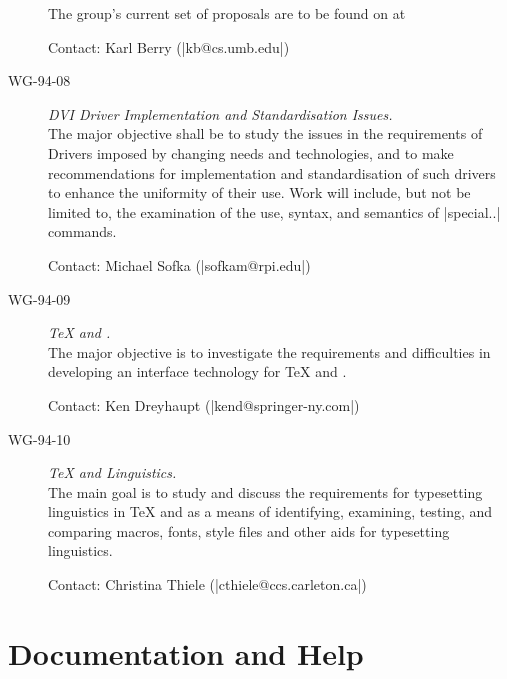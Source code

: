 \begin{description}
The group's current set of proposals are to be found on  at 

Contact: %
Karl Berry (\Email|kb@cs.umb.edu|)

\item[WG-94-08]\emph{DVI Driver Implementation and Standardisation Issues.}\\
The major objective shall be to study the issues in
the requirements of  Drivers imposed by changing needs and
technologies, and to make recommendations for implementation and
standardisation of such drivers to enhance the uniformity of their use.
Work will include, but not be limited to, the examination of the use,
syntax, and semantics of \cs|special{..}| commands.

Contact: Michael Sofka (\Email|sofkam@rpi.edu|)

\item[WG-94-09]\emph{\TeX{} and .}\\
The major objective is to investigate the
requirements and  difficulties in developing an interface technology
for \TeX{} and .

Contact: Ken Dreyhaupt (\Email|kend@springer-ny.com|)


\item[WG-94-10]\emph{\TeX{} and Linguistics.}\\
The main goal is to study and discuss the
requirements for typesetting linguistics in \TeX{} and as a means of
identifying, examining, testing, and comparing macros, fonts, style files
and other aids for typesetting linguistics.

Contact: Christina Thiele (\Email|cthiele@ccs.carleton.ca|)
\end{description}


\section{Documentation and Help}


